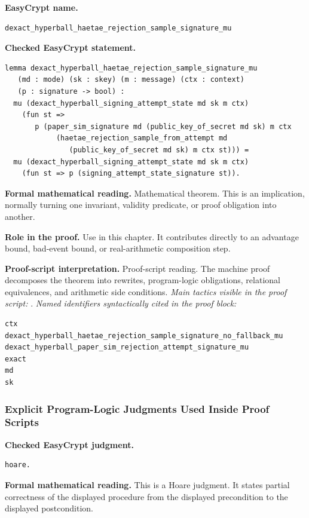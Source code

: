 \begin{formaltheorem}
\noindent\textbf{EasyCrypt name.}
\begin{lstlisting}[language=EasyCrypt,basicstyle=\ttfamily\scriptsize]
dexact_hyperball_haetae_rejection_sample_signature_mu
\end{lstlisting}
\noindent\textbf{Checked EasyCrypt statement.}
\begin{lstlisting}[language=EasyCrypt,basicstyle=\ttfamily\scriptsize]
lemma dexact_hyperball_haetae_rejection_sample_signature_mu
   (md : mode) (sk : skey) (m : message) (ctx : context)
   (p : signature -> bool) :
  mu (dexact_hyperball_signing_attempt_state md sk m ctx)
    (fun st =>
       p (paper_sim_signature md (public_key_of_secret md sk) m ctx
            (haetae_rejection_sample_from_attempt md
               (public_key_of_secret md sk) m ctx st))) =
  mu (dexact_hyperball_signing_attempt_state md sk m ctx)
    (fun st => p (signing_attempt_state_signature st)).
\end{lstlisting}
\noindent\textbf{Formal mathematical reading.}
Mathematical theorem. This is an implication, normally turning one invariant, validity predicate, or proof obligation into another.

\noindent\textbf{Role in the proof.}
Use in this chapter. It contributes directly to an advantage bound, bad-event bound, or real-arithmetic composition step.

\noindent\textbf{Proof-script interpretation.}
Proof-script reading. The machine proof decomposes the theorem into rewrites, program-logic obligations, relational equivalences, and arithmetic side conditions.
\emph{Main tactics visible in the proof script:} .
\emph{Named identifiers syntactically cited in the proof block:}
\begin{lstlisting}[language=EasyCrypt,basicstyle=\ttfamily\scriptsize]
ctx
dexact_hyperball_haetae_rejection_sample_signature_no_fallback_mu
dexact_hyperball_paper_sim_rejection_attempt_signature_mu
exact
md
sk
\end{lstlisting}

\end{formaltheorem}

\subsubsection*{Explicit Program-Logic Judgments Used Inside Proof Scripts}
\begin{formaljudgment}
\noindent\textbf{Checked EasyCrypt judgment.}
\begin{lstlisting}[language=EasyCrypt,basicstyle=\ttfamily\scriptsize]
hoare.
\end{lstlisting}
\noindent\textbf{Formal mathematical reading.} This is a Hoare judgment.  It states partial correctness of the displayed procedure from the displayed precondition to the displayed postcondition.
\end{formaljudgment}


